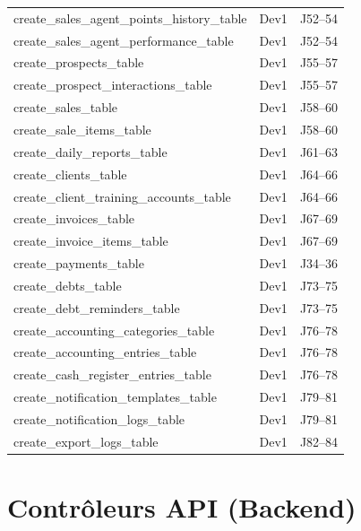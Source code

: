 \documentclass[12pt,a4paper]{report}
\begin{document}
\begin{longtable}{L{6cm} L{3cm} L{5cm}}
    create\_sales\_agent\_points\_history\_table & Dev1 & J52--54 \\
    create\_sales\_agent\_performance\_table & Dev1 & J52--54 \\
    create\_prospects\_table & Dev1 & J55--57 \\
    create\_prospect\_interactions\_table & Dev1 & J55--57 \\
    create\_sales\_table & Dev1 & J58--60 \\
    create\_sale\_items\_table & Dev1 & J58--60 \\
    create\_daily\_reports\_table & Dev1 & J61--63 \\
    create\_clients\_table & Dev1 & J64--66 \\
    create\_client\_training\_accounts\_table & Dev1 & J64--66 \\
    create\_invoices\_table & Dev1 & J67--69 \\
    create\_invoice\_items\_table & Dev1 & J67--69 \\
    create\_payments\_table & Dev1 & J34--36 \\
    create\_debts\_table & Dev1 & J73--75 \\
    create\_debt\_reminders\_table & Dev1 & J73--75 \\
    create\_accounting\_categories\_table & Dev1 & J76--78 \\
    create\_accounting\_entries\_table & Dev1 & J76--78 \\
    create\_cash\_register\_entries\_table & Dev1 & J76--78 \\
    create\_notification\_templates\_table & Dev1 & J79--81 \\
    create\_notification\_logs\_table & Dev1 & J79--81 \\
    create\_export\_logs\_table & Dev1 & J82--84 \\
    \bottomrule
\end{longtable}

\section{Contrôleurs API (Backend)}
\end{document}
